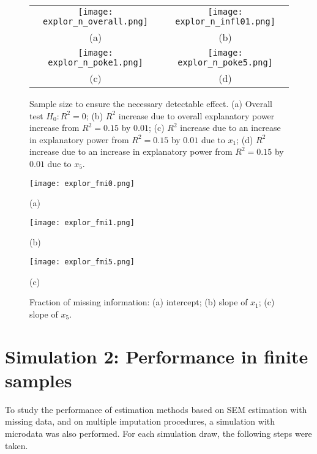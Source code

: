\documentclass[11pt]{asaproc}
\begin{document}
\begin{figure}[!bh]

    \centering

    \begin{tabular}{cc}
        \texttt{[image: explor\_n\_overall.png]}
        &
        \texttt{[image: explor\_n\_infl01.png]}
        \\
        (a) & (b) \\
        \texttt{[image: explor\_n\_poke1.png]}
        &
        \texttt{[image: explor\_n\_poke5.png]}
        \\
        (c) & (d)
    \end{tabular}

    \caption{
        \label{fig:explore:n}
        Sample size to ensure the necessary detectable effect.
        (a) Overall test $H_0: R^2=0$;
        (b) $R^2$ increase due to overall explanatory power increase from $R^2=0.15$ by $0.01$;
        (c) $R^2$ increase due to an increase in explanatory power from $R^2=0.15$ by $0.01$ due to $x_1$;
        (d) $R^2$ increase due to an increase in explanatory power from $R^2=0.15$ by $0.01$ due to $x_5$.
    }

\end{figure}

\begin{figure}[!bh]

    \centering

    \texttt{[image: explor\_fmi0.png]}

    (a)

    \texttt{[image: explor\_fmi1.png]}

    (b)

    \texttt{[image: explor\_fmi5.png]}

    (c)

    \caption{
        \label{fig:explore:fmi}
        Fraction of missing information:
        (a) intercept; (b) slope of $x_1$; (c) slope of $x_5$.
    }

\end{figure}


\section{Simulation 2: Performance in finite samples}

To study the performance of estimation methods based on SEM estimation with missing data, and on multiple imputation procedures,
a simulation with microdata was also performed. For each simulation draw, the following steps were taken.
\end{document}
